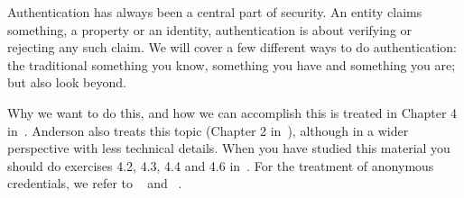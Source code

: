 Authentication has always been a central part of security.
An entity claims something, a property or an identity, authentication is about 
verifying or rejecting any such claim.
We will cover a few different ways to do authentication: the traditional 
something you know, something you have and something you are; but also look 
beyond.

Why we want to do this, and how we can accomplish this is treated in Chapter 
4 in~\cite{Gollmann2011cs}.
Anderson also treats this topic (Chapter 2 in~\cite{Anderson2008sea}), although 
in a wider perspective with less technical details.
When you have studied this material you should do exercises 4.2, 4.3, 4.4 and 
4.6 in~\cite{Gollmann2011cs}.
For the treatment of anonymous credentials, we refer to 
~\cite{AnonymousCredentials} and 
~\cite{AnonPass-magazine}.
